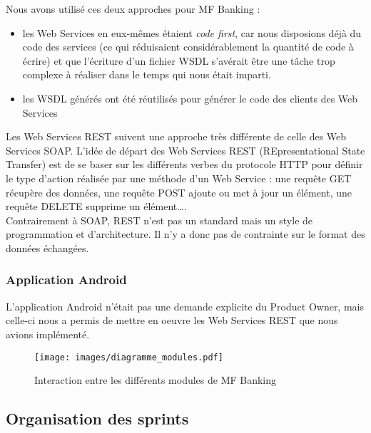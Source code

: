 Nous avons utilisé ces deux approches pour MF Banking :
\begin{itemize}
	\item les Web Services en eux-mêmes étaient \textit{code first}, car nous disposions déjà du code des services (ce qui réduisaient considérablement la quantité de code à écrire) et que l'écriture d'un fichier WSDL s'avérait être une tâche trop complexe à réaliser dans le temps qui nous était imparti.
	\item les WSDL générés ont été réutilisés pour générer le code des clients des Web Services\\
\end{itemize}

Les Web Services REST suivent une approche très différente de celle des Web Services SOAP. L'idée de départ des Web Services REST (REpresentational State Transfer) est de se baser sur les différents \og verbes \fg{} du protocole HTTP pour définir le type d'action réalisée par une méthode d'un Web Service : une requête GET récupère des données, une requête POST ajoute ou met à jour un élément, une requête DELETE supprime un élément\ldots.\\
Contrairement à SOAP, REST n'est pas un standard mais un style de programmation et d'architecture. Il n'y a donc pas de contrainte sur le format des données échangées.\\

\subsubsection*{Application Android}

L'application Android n'était pas une demande explicite du Product Owner, mais celle-ci nous a permis de mettre en oeuvre les Web Services REST que nous avions implémenté.

\begin{figure}[h!]
	\centering
		\texttt{[image: images/diagramme\_modules.pdf]}
	\caption{Interaction entre les différents modules de MF Banking}
\end{figure}  

\subsection{Organisation des sprints}

